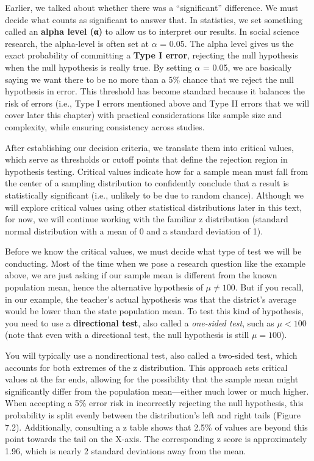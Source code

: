 \documentclass[
  letterpaper,
  DIV=11,
  numbers=noendperiod]{scrreprt}
\begin{document}
Earlier, we talked about whether there was a ``significant'' difference.
We must decide what counts as significant to answer that. In statistics,
we set something called an \textbf{alpha level (α)} to allow us to
interpret our results. In social science research, the alpha-level is
often set at \(\alpha\) = 0.05. The alpha level gives us the exact
probability of committing a \textbf{Type I error}, rejecting the null
hypothesis when the null hypothesis is really true. By setting
\(\alpha\) = 0.05, we are basically saying we want there to be no more
than a 5\% chance that we reject the null hypothesis in error. This
threshold has become standard because it balances the risk of errors
(i.e., Type I errors mentioned above and Type II errors that we will
cover later this chapter) with practical considerations like sample size
and complexity, while ensuring consistency across studies.

After establishing our decision criteria, we translate them into
critical values, which serve as thresholds or cutoff points that define
the rejection region in hypothesis testing. Critical values indicate how
far a sample mean must fall from the center of a sampling distribution
to confidently conclude that a result is statistically significant
(i.e., unlikely to be due to random chance). Although we will explore
critical values using other statistical distributions later in this
text, for now, we will continue working with the familiar z distribution
(standard normal distribution with a mean of 0 and a standard deviation
of 1).

Before we know the critical values, we must decide what type of test we
will be conducting. Most of the time when we pose a research question
like the example above, we are just asking if our sample mean is
different from the known population mean, hence the alternative
hypothesis of \(\mu \ne 100\). But if you recall, in our example, the
teacher's actual hypothesis was that the district's average would be
lower than the state population mean. To test this kind of hypothesis,
you need to use a \textbf{directional test}, also called a
\emph{one-sided test}, such as \(\mu < 100\) (note that even with a
directional test, the null hypothesis is still \(\mu = 100\)).

You will typically use a nondirectional test, also called a two-sided
test, which accounts for both extremes of the z distribution. This
approach sets critical values at the far ends, allowing for the
possibility that the sample mean might significantly differ from the
population mean---either much lower or much higher. When accepting a 5\%
error risk in incorrectly rejecting the null hypothesis, this
probability is split evenly between the distribution's left and right
tails (Figure 7.2). Additionally, consulting a z table shows that 2.5\%
of values are beyond this point towards the tail on the X-axis. The
corresponding z score is approximately 1.96, which is nearly 2 standard
deviations away from the mean.
\end{document}
